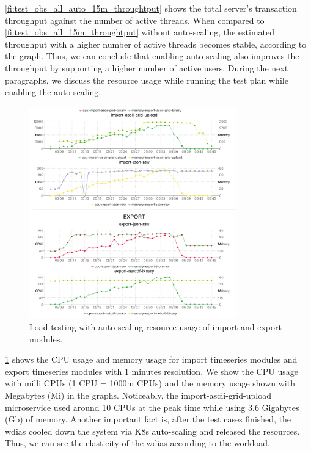 \cref{fi:test_obs_all_auto_15m_throughtput} shows the total server's transaction throughput against the number of active threads. When compared to \cref{fi:test_obs_all_15m_throughtput} without auto-scaling, the estimated throughput with a higher number of active threads becomes stable, according to the graph. Thus, we can conclude that enabling auto-scaling also improves the throughput by supporting a higher number of active users. During the next paragraphs, we discuss the resource usage while running the test plan while enabling the auto-scaling.

\begin{figure}[htp]
    \centering
    \includegraphics[width=0.8\textwidth]{results/obs/all_auto/obs_all_auto_15m_import_export_res.png}
    \caption{Load testing with auto-scaling resource usage of import and export modules.}
    \label{fi:obs_all_auto_15m_import_export_res}
\end{figure}

\cref{fi:obs_all_auto_15m_import_export_res} shows the CPU usage and memory usage for import timeseries modules and export timeseries modules with 1 minutes resolution. We show the CPU usage with milli CPUs \cite{LinuxFoundationManagingKubernetes} (1 CPU = 1000m CPUs) and the memory usage shown with Megabytes (Mi) \cite{LinuxFoundationManagingKubernetes} in the graphs. Noticeably, the import-ascii-grid-upload microservice used around 10 CPUs at the peak time while using 3.6 Gigabytes (Gb) of memory. Another important fact is, after the test cases finished, the \acrshort{wdias} cooled down the system via K8s auto-scaling and released the resources. Thus, we can see the elasticity of the \acrshort{wdias} according to the workload.

